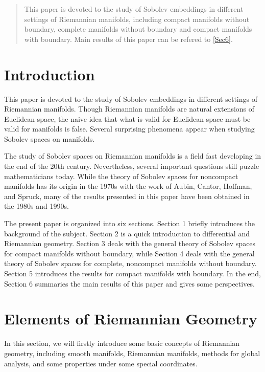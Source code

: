 \documentclass[12pt,hyperref,a4paper,UTF8]{ctexart}
\begin{document}
\cover

\begin{abstract}
    This paper is devoted to the study of Sobolev embeddings in different settings of Riemannian manifolds, including compact manifolds without boundary, complete manifolds without boundary and compact manifolds with boundary. Main results of this paper can be refered to \autoref{Sec6}. 
\end{abstract}

\thispagestyle{empty} %

\newpage
\tableofcontents

\newpage
\section{Introduction}
This paper is devoted to the study of Sobolev embeddings in different settings of Riemannian manifolds. 
Though Riemannian manifolds are natural extensions of Euclidean space, the naive idea that what is valid for Euclidean space must be valid for manifolds is false. Several surprising phenomena appear when studying Sobolev spaces on manifolds.

The study of Sobolev spaces on Riemannian manifolds is a field fast developing in the end of the 20th century. 
Nevertheless, several important questions still puzzle mathematicians today. While the theory of Sobolev spaces for noncompact manifolds has its origin in the 1970s with the work of Aubin, Cantor, Hoffman, and Spruck, many of the results presented in this paper have been obtained in the 1980s and 1990s.

The present paper is organized into six sections. Section 1 briefly introduces the background of the subject. Section 2 is a quick introduction to differential and Riemannian geometry.
Section 3 deals with the general theory of Sobolev spaces for compact manifolds without boundary, while Section 4 deals with the general theory of Sobolev spaces for complete, noncompact manifolds without boundary.
Section 5 introduces the results for compact manifolds with boundary. In the end, Section 6 summaries the main results of this paper and gives some perspectives. 
\newpage
\section{Elements of Riemannian Geometry}
In this section, we will firstly introduce some basic concepts of Riemannian geometry, including smooth manifolds, Riemannian manifolds, methods for global analysis, and some properties under some special coordinates.
\end{document}
